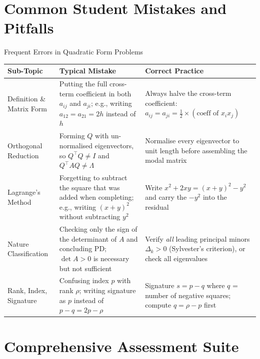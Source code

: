 \documentclass[12pt,a4paper]{article}
\begin{document}
\section{Common Student Mistakes and Pitfalls}

\begin{mistakebox}{Frequent Errors in Quadratic Form Problems}
\begin{tabular}{@{}p{3.5cm}p{5.5cm}p{5.5cm}@{}}
\toprule
\textbf{Sub-Topic} & \textbf{Typical Mistake} & \textbf{Correct Practice} \\
\midrule
Definition \& Matrix Form
  & Putting the full cross-term coefficient in both $a_{ij}$ and $a_{ji}$; e.g., writing $a_{12}=a_{21}=2h$ instead of $h$
  & Always halve the cross-term coefficient: $a_{ij} = a_{ji} = \frac{1}{2}\times(\text{coeff of } x_ix_j)$ \\
\addlinespace
Orthogonal Reduction
  & Forming $Q$ with un-normalised eigenvectors, so $Q^{\top}Q \neq I$ and $Q^{\top}AQ \neq \Lambda$
  & Normalise every eigenvector to unit length before assembling the modal matrix \\
\addlinespace
Lagrange's Method
  & Forgetting to subtract the square that was added when completing; e.g., writing $(x+y)^{2}$ without subtracting $y^{2}$
  & Write $x^{2}+2xy = (x+y)^{2} - y^{2}$ and carry the $-y^{2}$ into the residual \\
\addlinespace
Nature Classification
  & Checking only the sign of the determinant of $A$ and concluding PD; $\det A > 0$ is necessary but not sufficient
  & Verify \emph{all} leading principal minors $\Delta_k > 0$ (Sylvester's criterion), or check all eigenvalues \\
\addlinespace
Rank, Index, Signature
  & Confusing index $p$ with rank $\rho$; writing signature as $p$ instead of $p - q = 2p - \rho$
  & Signature $s = p - q$ where $q$ = number of negative squares; compute $q = \rho - p$ first \\
\bottomrule
\end{tabular}
\end{mistakebox}

\section{Comprehensive Assessment Suite}
\end{document}
